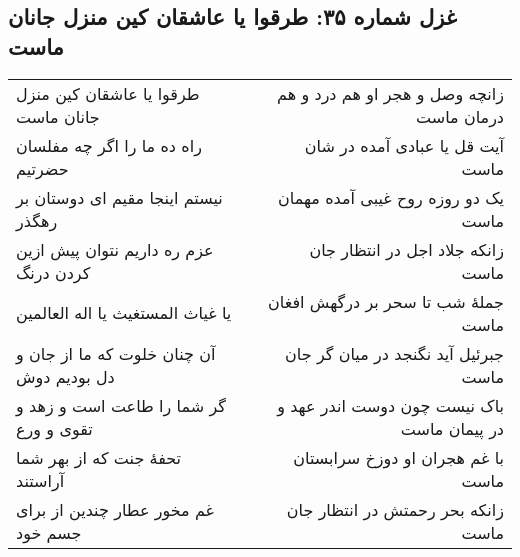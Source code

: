 \begin{center}
\section*{غزل شماره ۳۵: طرقوا یا عاشقان کین منزل جانان ماست}
\label{sec:035}
\begin{longtable}{l p{0.5cm} r}
طرقوا یا عاشقان کین منزل جانان ماست
&&
زانچه وصل و هجر او هم درد و هم درمان ماست
\\
راه ده ما را اگر چه مفلسان حضرتیم
&&
آیت قل یا عبادی آمده در شان ماست
\\
نیستم اینجا مقیم ای دوستان بر رهگذر
&&
یک دو روزه روح غیبی آمده مهمان ماست
\\
عزم ره داریم نتوان پیش ازین کردن درنگ
&&
زانکه جلاد اجل در انتظار جان ماست
\\
یا غیاث المستغیث یا اله العالمین
&&
جملهٔ شب تا سحر بر درگهش افغان ماست
\\
آن چنان خلوت که ما از جان و دل بودیم دوش
&&
جبرئیل آید نگنجد در میان گر جان ماست
\\
گر شما را طاعت است و زهد و تقوی و ورع
&&
باک نیست چون دوست اندر عهد و در پیمان ماست
\\
تحفهٔ جنت که از بهر شما آراستند
&&
با غم هجران او دوزخ سرابستان ماست
\\
غم مخور عطار چندین از برای جسم خود
&&
زانکه بحر رحمتش در انتظار جان ماست
\\
\end{longtable}
\end{center}
